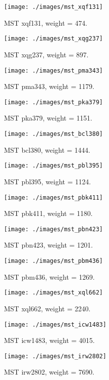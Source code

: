 \documentclass[a4paper, 12pt]{article}
\begin{document}
\begin{figure}[h]
  \texttt{[image: ./images/mst\_xqf131]}
  \caption{MST xqf131, weight = 474.}
  \label{fig:mst_xqf131}
\end{figure}
\begin{figure}[h]
  \texttt{[image: ./images/mst\_xqg237]}
  \caption{MST xqg237, weight = 897.}
  \label{fig:mst_xqg237}
\end{figure}
\begin{figure}[h]
  \texttt{[image: ./images/mst\_pma343]}
  \caption{MST pma343, weight = 1179.}
  \label{fig:mst_pma343}
\end{figure}
\begin{figure}[h]
  \texttt{[image: ./images/mst\_pka379]}
  \caption{MST pka379, weight = 1151.}
  \label{fig:mst_pka379}
\end{figure}
\begin{figure}[h]
  \texttt{[image: ./images/mst\_bcl380]}
  \caption{MST bcl380, weight = 1444.}
  \label{fig:mst_bcl380}
\end{figure}
\begin{figure}[h]
  \texttt{[image: ./images/mst\_pbl395]}
  \caption{MST pbl395, weight = 1124.}
  \label{fig:mst_pbl395}
\end{figure}
\begin{figure}[h]
  \texttt{[image: ./images/mst\_pbk411]}
  \caption{MST pbk411, weight = 1180.}
  \label{fig:mst_pbk411}
\end{figure}
\begin{figure}[h]
  \texttt{[image: ./images/mst\_pbn423]}
  \caption{MST pbn423, weight = 1201.}
  \label{fig:mst_pbn423}
\end{figure}
\begin{figure}[h]
  \texttt{[image: ./images/mst\_pbm436]}
  \caption{MST pbm436, weight = 1269.}
  \label{fig:mst_pbm436}
\end{figure}
\begin{figure}[h]
  \texttt{[image: ./images/mst\_xql662]}
  \caption{MST xql662, weight = 2240.}
  \label{fig:mst_xql662}
\end{figure}
\begin{figure}[h]
  \texttt{[image: ./images/mst\_icw1483]}
  \caption{MST icw1483, weight = 4015.}
  \label{fig:mst_icw1483}
\end{figure}
\begin{figure}[h]
  \texttt{[image: ./images/mst\_irw2802]}
  \caption{MST irw2802, weight = 7690.}
  \label{fig:mst_irw2802}
\end{figure}
\end{document}
